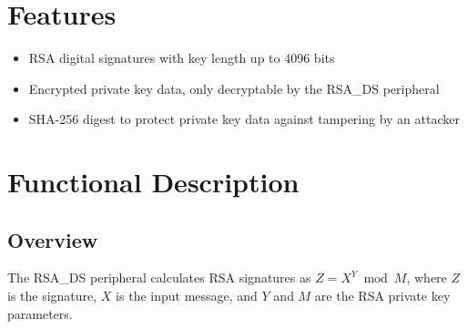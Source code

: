 \documentclass[main\_\_EN.tex]{subfiles}
\begin{document}
\section{Features}

\begin{itemize}
\item RSA digital signatures with key length up to 4096 bits
\item Encrypted private key data, only decryptable by the RSA\_DS peripheral
\item SHA-256 digest to protect private key data against tampering by an attacker
\end{itemize}

\section{Functional Description}
\subsection{Overview}

The RSA\_DS peripheral calculates RSA signatures as \begin{math}Z = X^{Y} \bmod M\end{math}, where \begin{math}Z\end{math} is the signature, \begin{math}X\end{math} is the input message, and \begin{math}Y\end{math} and \begin{math}M\end{math} are the RSA private key parameters.
\end{document}
